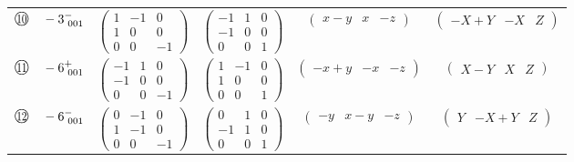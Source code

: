 \documentclass[fleqn,10pt,landscape]{jsarticle}
\begin{document}
\begin{center}
\begin{longtable}{lcccc}
$ {\ooalign{\hfil\resizebox{.8\width}{\height}{10}\hfil\crcr\raise.1ex\hbox{\large$\bigcirc$}}}\quad -3^{-}_{\,\,001} $ & $ \begin{pmatrix} 1 & -1 & 0 \\ 1 & 0 & 0 \\ 0 & 0 & -1 \end{pmatrix} $ & $ \begin{pmatrix} -1 & 1 & 0 \\ -1 & 0 & 0 \\ 0 & 0 & 1 \end{pmatrix} $ & $ \begin{pmatrix} x - y & x & - z \end{pmatrix} $ & $ \begin{pmatrix} - X + Y & - X & Z \end{pmatrix} $ \\
$ {\ooalign{\hfil\resizebox{.8\width}{\height}{11}\hfil\crcr\raise.1ex\hbox{\large$\bigcirc$}}}\quad -6^{+}_{\,\,001} $ & $ \begin{pmatrix} -1 & 1 & 0 \\ -1 & 0 & 0 \\ 0 & 0 & -1 \end{pmatrix} $ & $ \begin{pmatrix} 1 & -1 & 0 \\ 1 & 0 & 0 \\ 0 & 0 & 1 \end{pmatrix} $ & $ \begin{pmatrix} - x + y & - x & - z \end{pmatrix} $ & $ \begin{pmatrix} X - Y & X & Z \end{pmatrix} $ \\
$ {\ooalign{\hfil\resizebox{.8\width}{\height}{12}\hfil\crcr\raise.1ex\hbox{\large$\bigcirc$}}}\quad -6^{-}_{\,\,001} $ & $ \begin{pmatrix} 0 & -1 & 0 \\ 1 & -1 & 0 \\ 0 & 0 & -1 \end{pmatrix} $ & $ \begin{pmatrix} 0 & 1 & 0 \\ -1 & 1 & 0 \\ 0 & 0 & 1 \end{pmatrix} $ & $ \begin{pmatrix} - y & x - y & - z \end{pmatrix} $ & $ \begin{pmatrix} Y & - X + Y & Z \end{pmatrix} $ \\
\end{longtable}
\end{center}
\end{document}

